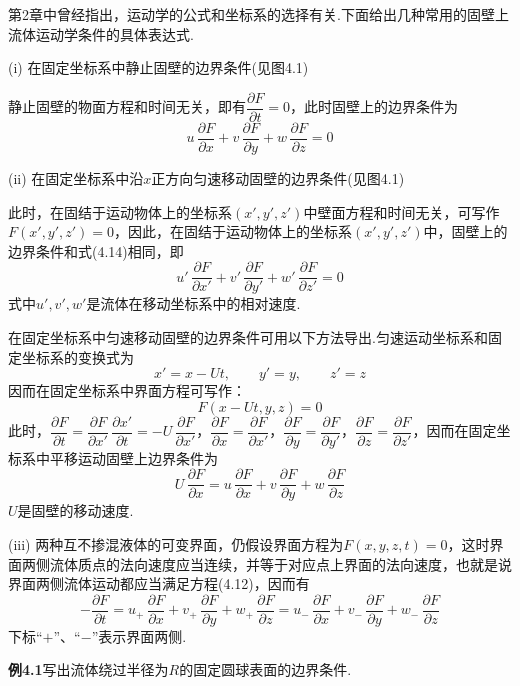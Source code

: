 第2章中曾经指出，运动学的公式和坐标系的选择有关.下面给出几种常用的固壁上流体运动学条件的具体表达式.

(i) 在固定坐标系中静止固壁的边界条件(见图4.1)

静止固壁的物面方程和时间无关，即有$\dfrac{\partial F}{\partial t}=0$，此时固壁上的边界条件为
\begin{equation*}
u\,\frac{\partial F}{\partial x}+v\,\frac{\partial F}{\partial y}+w\,\frac{\partial F}{\partial z}=0
\tag{4.14}
\end{equation*}

(ii) 在固定坐标系中沿$x$正方向匀速移动固壁的边界条件(见图4.1)

此时，在固结于运动物体上的坐标系$(x',y',z')$中壁面方程和时间无关，可写作$F(x',y',z')=0$，因此，在固结于运动物体上的坐标系$(x',y',z')$中，固壁上的边界条件和式(4.14)相同，即
\[
u'\,\frac{\partial F}{\partial x'}+v'\,\frac{\partial F}{\partial y'}+w'\,\frac{\partial F}{\partial z'}=0
\]
式中$u',v',w'$是流体在移动坐标系中的相对速度.

在固定坐标系中匀速移动固壁的边界条件可用以下方法导出.匀速运动坐标系和固定坐标系的变换式为
\[
x'=x-Ut,\qquad y'=y,\qquad z'=z
\]
因而在固定坐标系中界面方程可写作：
\[
F(x-Ut,y,z)=0
\]
此时，$\dfrac{\partial F}{\partial t}=\dfrac{\partial F}{\partial x'}\,\dfrac{\partial x'}{\partial t}=-U\,\dfrac{\partial F}{\partial x'}$，$\dfrac{\partial F}{\partial x}=\dfrac{\partial F}{\partial x'}$，$\dfrac{\partial F}{\partial y}=\dfrac{\partial F}{\partial y'}$，$\dfrac{\partial F}{\partial z}=\dfrac{\partial F}{\partial z'}$，因而在固定坐标系中平移运动固壁上边界条件为
\begin{equation*}
U\,\frac{\partial F}{\partial x}=u\,\frac{\partial F}{\partial x}+v\,\frac{\partial F}{\partial y}+w\,\frac{\partial F}{\partial z}
\tag{4.15}
\end{equation*}
$U$是固壁的移动速度.

(iii) 两种互不掺混液体的可变界面，仍假设界面方程为$F(x,y,z,t)=0$，这时界面两侧流体质点的法向速度应当连续，并等于对应点上界面的法向速度，也就是说界面两侧流体运动都应当满足方程(4.12)，因而有
\begin{equation*}
-\frac{\partial F}{\partial t}=u_{+}\,\frac{\partial F}{\partial x}+v_{+}\,\frac{\partial F}{\partial y}+w_{+}\,\frac{\partial F}{\partial z}=u_{-}\,\frac{\partial F}{\partial x}+v_{-}\,\frac{\partial F}{\partial y}+w_{-}\,\frac{\partial F}{\partial z}
\tag{4.16}
\end{equation*}
下标“$+$”、“$-$”表示界面两侧.

\noindent\textbf{例4.1}\quad 写出流体绕过半径为$R$的固定圆球表面的边界条件.

